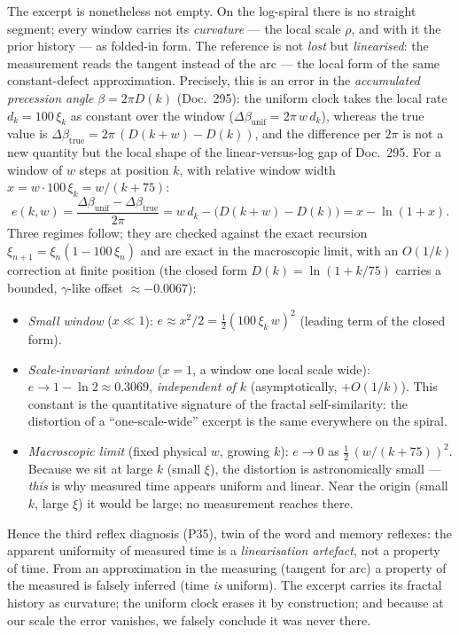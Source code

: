 The excerpt is nonetheless not empty. On the log-spiral there is no straight segment; every
window carries its \emph{curvature} --- the local scale $\rho$, and with it the prior history
--- as folded-in form. The reference is not \emph{lost} but \emph{linearised}: the
measurement reads the tangent instead of the arc --- the local form of the same
constant-defect approximation. Precisely, this is an error in the \emph{accumulated precession angle}
$\beta = 2\pi D(k)$ (Doc.~295): the uniform clock takes the local rate $d_k = 100\,\xi_k$ as
constant over the window ($\Delta\beta_{\text{unif}} = 2\pi\,w\,d_k$), whereas the true value
is $\Delta\beta_{\text{true}} = 2\pi\,(D(k{+}w)-D(k))$, and the difference per $2\pi$ is not a
new quantity but the local shape of the linear-versus-log gap of Doc.~295. For a window of
$w$ steps at position $k$, with relative window width $x = w\cdot 100\,\xi_k = w/(k+75)$:
\begin{equation}
e(k,w) = \frac{\Delta\beta_{\text{unif}} - \Delta\beta_{\text{true}}}{2\pi}
       = w\,d_k - \big(D(k{+}w)-D(k)\big) = x - \ln(1+x).
\end{equation}
Three regimes follow; they are checked against the exact recursion
$\xi_{n+1}=\xi_n(1-100\,\xi_n)$ and are exact in the macroscopic limit, with an $O(1/k)$
correction at finite position (the closed form $D(k)=\ln(1+k/75)$ carries a bounded,
$\gamma$-like offset $\approx-0.0067$):
\begin{itemize}
\item \emph{Small window} ($x\ll1$): $e \approx x^2/2 = \tfrac12(100\,\xi_k\,w)^2$ (leading
term of the closed form).
\item \emph{Scale-invariant window} ($x=1$, a window one local scale wide): $e \to 1-\ln 2
\approx 0.3069$, \emph{independent of $k$} (asymptotically, $+O(1/k)$). This constant is the
quantitative signature of the fractal self-similarity: the distortion of a
\enquote{one-scale-wide} excerpt is the same everywhere on the spiral.
\item \emph{Macroscopic limit} (fixed physical $w$, growing $k$): $e \to 0$ as
$\tfrac12\,(w/(k+75))^2$. Because we sit at large $k$ (small $\xi$), the distortion is
astronomically small --- \emph{this} is why measured time appears uniform and linear. Near the
origin (small $k$, large $\xi$) it would be large; no measurement reaches there.
\end{itemize}

Hence the third reflex diagnosis (P35), twin of the word and memory reflexes: the apparent
uniformity of measured time is a \emph{linearisation artefact}, not a property of time. From
an approximation in the measuring (tangent for arc) a property of the measured is falsely
inferred (time \emph{is} uniform). The excerpt carries its fractal history as curvature; the
uniform clock erases it by construction; and because at our scale the error vanishes, we
falsely conclude it was never there.

